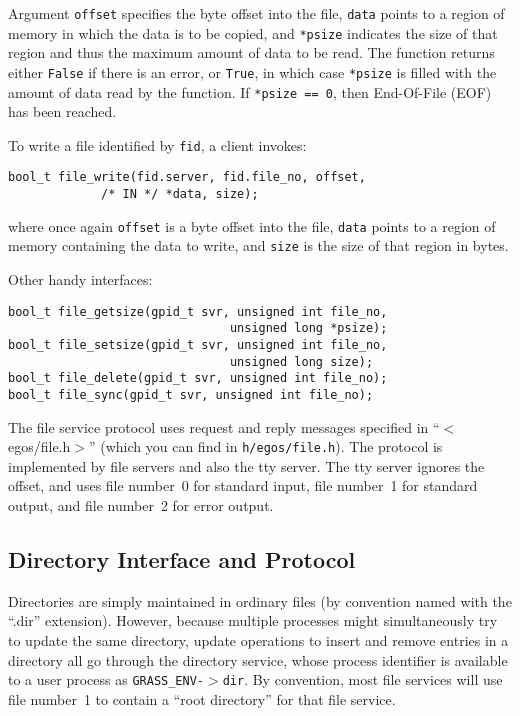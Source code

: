 \documentclass{article}
\begin{document}
Argument \texttt{offset} specifies the byte offset into the file,
\texttt{data} points to a region of memory in which the data is
to be copied, and \texttt{*psize} indicates the size of that region
and thus the maximum amount of data to be read.
The function returns either \texttt{False} if there is an error,
or \texttt{True}, in which case \texttt{*psize} is filled with the
amount of data read by the function.  If \texttt{*psize == 0}, then
End-Of-File (EOF) has been reached.

To write a file identified by \texttt{fid}, a client invokes:
\begin{verbatim}
bool_t file_write(fid.server, fid.file_no, offset,
             /* IN */ *data, size);
\end{verbatim}

where once again \texttt{offset} is a byte offset into the file,
\texttt{data} points to a region of memory containing the data to
write, and \texttt{size} is the size of that region in bytes.

Other handy interfaces:

\begin{verbatim}
bool_t file_getsize(gpid_t svr, unsigned int file_no,
                               unsigned long *psize);
bool_t file_setsize(gpid_t svr, unsigned int file_no,
                               unsigned long size);
bool_t file_delete(gpid_t svr, unsigned int file_no);
bool_t file_sync(gpid_t svr, unsigned int file_no);
\end{verbatim}

The file service protocol uses request and reply messages
specified in ``$<$egos/file.h$>$'' (which you can find in \texttt{h/egos/file.h}).
The protocol is implemented by
file servers and also the tty server.  The tty server ignores the offset,
and uses file number~0 for standard input, file number~1 for standard output,
and file number~2 for error output.

\subsection{Directory Interface and Protocol}

Directories are simply maintained in ordinary files (by convention
named with the ``.dir'' extension).  However, because multiple processes
might simultaneously try to update the same directory, update operations
to insert and remove entries in a directory all go through the
directory service, whose process identifier is available to a user
process as \texttt{GRASS\_ENV-$>$dir}.  By convention, most file services
will use file number~1 to contain a ``root directory'' for that file service.
\end{document}
